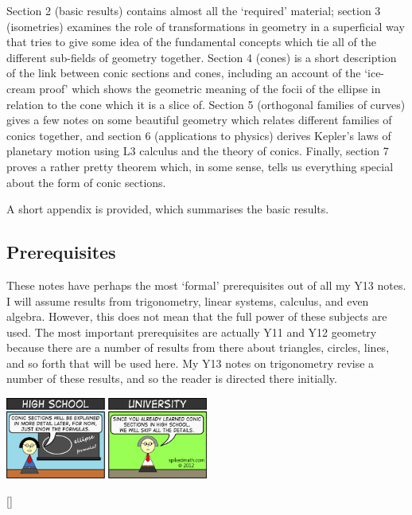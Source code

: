 \documentclass[a4paper,leqno,10pt]{article}
\theoremstyle{exercise}
\theoremstyle{plain}
\theoremstyle{definition}
\theoremstyle{remark}
\begin{document}
Section 2 (basic results) contains almost all the `required' material; section 3 (isometries) examines the role of transformations in geometry
in a superficial way that tries to give some idea of the fundamental concepts which tie all of the different sub-fields of geometry together.
Section 4 (cones) is a short description of the link between conic sections and cones, including an account of the `ice-cream proof' which shows
the geometric meaning of the focii of the ellipse in relation to the cone which it is a slice of. Section 5 (orthogonal families of curves) gives
a few notes on some beautiful geometry which relates different families of conics together, and section 6 (applications to physics) derives Kepler's
laws of planetary motion using L3 calculus and the theory of conics. Finally, section 7 proves a rather pretty theorem which, in some sense, tells
us everything special about the form of conic sections.

A short appendix is provided, which summarises the basic results.

\subsection*{Prerequisites}
These notes have perhaps the most `formal' prerequisites out of all my Y13 notes. I will assume results from trigonometry, linear systems, calculus, and
even algebra. However, this does not mean that the full power of these subjects are used. The most important prerequisites are actually Y11 and Y12
geometry because there are a number of results from there about triangles, circles, lines, and so forth that will be used here. My Y13 notes on trigonometry
revise a number of these results, and so the reader is directed there initially.

\begin{center}
  \includegraphics[width=0.5\textwidth]{conics}
\end{center}

[{\titlerule[0.8pt]}]
\let\oldsection\section
\renewcommand\section{\clearpage\oldsection}
\end{document}
